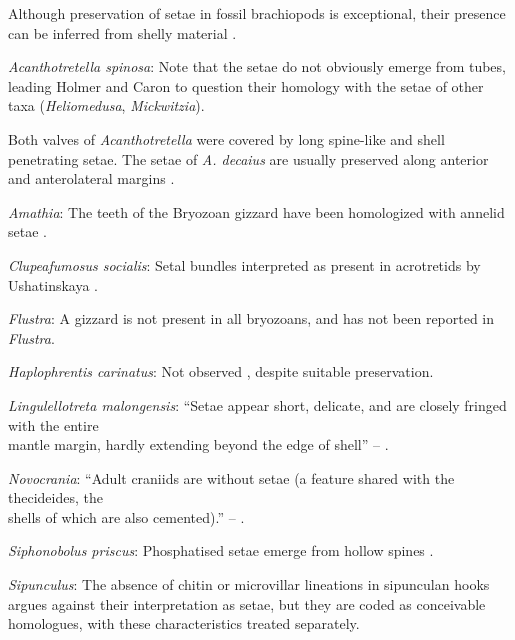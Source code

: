 \documentclass[openany]{book}
\begin{document}
Although preservation of setae in fossil brachiopods is exceptional,
their presence can be inferred from shelly material
\citep[see][]{Holmer2006Aspinose}.

\hypertarget{Acanthotretella_spinosa-coding-10}{}
\emph{Acanthotretella spinosa}: Note that the setae do not obviously
emerge from tubes, leading Holmer and Caron to question their homology
with the setae of other taxa (\emph{Heliomedusa}, \emph{Mickwitzia}).

Both valves of \emph{Acanthotretella} were covered by long spine-like
and shell penetrating setae. The setae of \emph{A. decaius} are usually
preserved along anterior and anterolateral margins
\citep{Hu2010Softpart}.

\hypertarget{Amathia-coding-10}{}
\emph{Amathia}: The teeth of the Bryozoan gizzard have been homologized
with annelid setae \citep{Gordon1975}.

\hypertarget{Clupeafumosus_socialis-coding-10}{}
\emph{Clupeafumosus socialis}: Setal bundles interpreted as present in
acrotretids by Ushatinskaya \citeyearpar{Ushatinskaya2016Protegulumand}.

\hypertarget{Flustra-coding-10}{}
\emph{Flustra}: A gizzard is not present in all bryozoans, and has not
been reported in \emph{Flustra}.

\hypertarget{Haplophrentis_carinatus-coding-10}{}
\emph{Haplophrentis carinatus}: Not observed
\citep{Moysiuk2017Hyolithsare}, despite suitable preservation.

\hypertarget{Lingulellotreta_malongensis-coding-10}{}
\emph{Lingulellotreta malongensis}: ``Setae appear short, delicate, and
are closely fringed with the entire\\
mantle margin, hardly extending beyond the edge of shell'' --
\citet{Zhang2005}.

\hypertarget{Novocrania-coding-10}{}
\emph{Novocrania}: ``Adult craniids are without setae (a feature shared
with the thecideides, the\\
shells of which are also cemented).'' -- \citet{Williams2007Supplement}.

\hypertarget{Siphonobolus_priscus-coding-10}{}
\emph{Siphonobolus priscus}: Phosphatised setae emerge from hollow
spines \citep{Popov2009Earlyontogeny}.

\hypertarget{Sipunculus-coding-10}{}
\emph{Sipunculus}: The absence of chitin or microvillar lineations in
sipunculan hooks argues against their interpretation as setae, but they
are coded as conceivable homologues, with these characteristics treated
separately.
\end{document}
